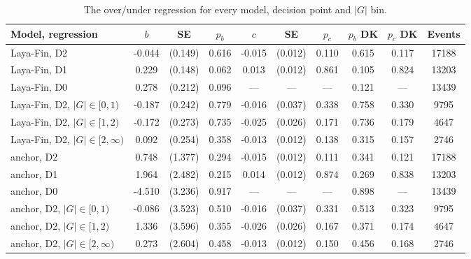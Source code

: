 \begin{landscape}
\begin{table}[htbp]
\centering
\small
\begin{threeparttable}
\caption{The over/under regression for every model, decision point and $|G|$ bin.}\label{tab:a-h2-over-under}
\begin{tabular}{@{}lS[table-format=-1.3]S[table-format=1.3, table-space-text-pre=(, table-space-text-post=)]S[table-format=1.3]S[table-format=-1.3]S[table-format=1.3, table-space-text-pre=(, table-space-text-post=)]S[table-format=1.3]S[table-format=1.3]S[table-format=1.3]S[table-format=5.0]@{}}
\toprule
Model, regression & {$b$} & {SE} & {$p_b$} & {$c$} & {SE} & {$p_c$} & {$p_b$ DK} & {$p_c$ DK} & {Events} \\
\midrule
Laya-Fin, D2 & -0.044 & {(}0.149{)} & 0.616 & -0.015 & {(}0.012{)} & 0.110 & 0.615 & 0.117 & 17188 \\
Laya-Fin, D1 & 0.229 & {(}0.148{)} & 0.062 & 0.013 & {(}0.012{)} & 0.861 & 0.105 & 0.824 & 13203 \\
Laya-Fin, D0 & 0.278 & {(}0.212{)} & 0.096 & {---} & {---} & {---} & 0.121 & {---} & 13439 \\
Laya-Fin, D2, $|G| \in [0, 1)$ & -0.187 & {(}0.242{)} & 0.779 & -0.016 & {(}0.037{)} & 0.338 & 0.758 & 0.330 & 9795 \\
Laya-Fin, D2, $|G| \in [1, 2)$ & -0.172 & {(}0.273{)} & 0.735 & -0.025 & {(}0.026{)} & 0.171 & 0.736 & 0.179 & 4647 \\
Laya-Fin, D2, $|G| \in [2, \infty)$ & 0.092 & {(}0.254{)} & 0.358 & -0.013 & {(}0.012{)} & 0.138 & 0.315 & 0.157 & 2746 \\
anchor, D2 & 0.748 & {(}1.377{)} & 0.294 & -0.015 & {(}0.012{)} & 0.111 & 0.341 & 0.121 & 17188 \\
anchor, D1 & 1.964 & {(}2.482{)} & 0.215 & 0.014 & {(}0.012{)} & 0.874 & 0.269 & 0.838 & 13203 \\
anchor, D0 & -4.510 & {(}3.236{)} & 0.917 & {---} & {---} & {---} & 0.898 & {---} & 13439 \\
anchor, D2, $|G| \in [0, 1)$ & -0.086 & {(}3.523{)} & 0.510 & -0.016 & {(}0.037{)} & 0.331 & 0.513 & 0.323 & 9795 \\
anchor, D2, $|G| \in [1, 2)$ & 1.336 & {(}3.596{)} & 0.355 & -0.026 & {(}0.026{)} & 0.167 & 0.371 & 0.174 & 4647 \\
anchor, D2, $|G| \in [2, \infty)$ & 0.273 & {(}2.604{)} & 0.458 & -0.013 & {(}0.012{)} & 0.150 & 0.456 & 0.168 & 2746 \\

\end{tabular}
\end{threeparttable}
\end{table}
\end{landscape}

